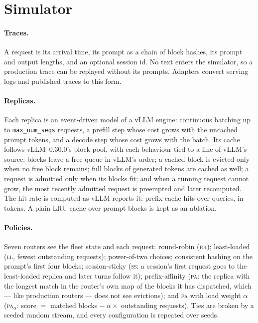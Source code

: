 \documentclass[10pt,twocolumn]{article}
\newcommand{\PA}{\textsc{pa}}
\newcommand{\SSt}{\textsc{ss}}
\newcommand{\RR}{\textsc{rr}}
\newcommand{\LL}{\textsc{ll}}
\begin{document}
\section{Simulator}\label{sec:sim}

\paragraph{Traces.} A request is its arrival time, its prompt as a chain of block hashes, its prompt
and output lengths, and an optional session id. No text enters the simulator, so a production trace
can be replayed without its prompts. Adapters convert serving logs and published traces to this form.

\paragraph{Replicas.} Each replica is an event-driven model of a vLLM engine: continuous batching up
to \texttt{max\_num\_seqs} requests, a prefill step whose cost grows with the uncached prompt tokens,
and a decode step whose cost grows with the batch. Its cache follows vLLM~0.30.0's block pool, with
each behaviour tied to a line of vLLM's source: blocks leave a free queue in vLLM's order; a cached
block is evicted only when no free block remains; full blocks of generated tokens are cached as well;
a request is admitted only when its blocks fit; and when a running request cannot grow, the most
recently admitted request is preempted and later recomputed. The hit rate is computed as vLLM reports
it: prefix-cache hits over queries, in tokens. A plain LRU cache over prompt blocks is kept as an
ablation.

\paragraph{Policies.} Seven routers see the fleet state and each request: round-robin (\RR);
least-loaded (\LL, fewest outstanding requests); power-of-two choices; consistent hashing on the
prompt's first four blocks; session-sticky (\SSt: a session's first request goes to the least-loaded
replica and later turns follow it); prefix-affinity (\PA: the replica with the longest match in the
router's own map of the blocks it has dispatched, which --- like production routers --- does not see
evictions); and \PA{} with load weight $\alpha$ (\PA$_\alpha$: score $=$ matched blocks $-\ \alpha
\times$ outstanding requests). Ties are broken by a seeded random stream, and every configuration is
repeated over seeds.
\end{document}
